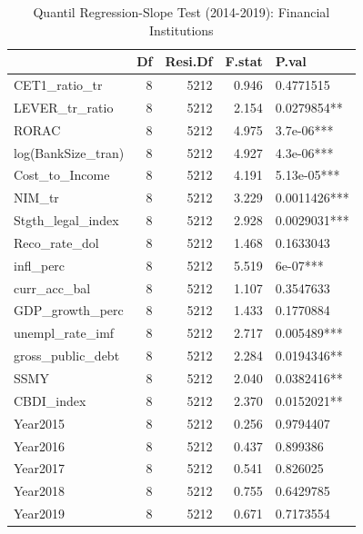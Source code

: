 \begin{table}[ht]
\centering
\caption{Quantil Regression-Slope Test (2014-2019): Financial Institutions} 
\begingroup\small
\begin{tabular}{lrrrl}
  \toprule
 & Df & Resi.Df & F.stat & P.val \\ 
  \midrule
CET1\_ratio\_tr & 8 & 5212 & 0.946 & 0.4771515 \\ 
  LEVER\_tr\_ratio & 8 & 5212 & 2.154 & 0.0279854** \\ 
  RORAC & 8 & 5212 & 4.975 & 3.7e-06*** \\ 
  log(BankSize\_tran) & 8 & 5212 & 4.927 & 4.3e-06*** \\ 
  Cost\_to\_Income & 8 & 5212 & 4.191 & 5.13e-05*** \\ 
  NIM\_tr & 8 & 5212 & 3.229 & 0.0011426*** \\ 
  Stgth\_legal\_index & 8 & 5212 & 2.928 & 0.0029031*** \\ 
  Reco\_rate\_dol & 8 & 5212 & 1.468 & 0.1633043 \\ 
  infl\_perc & 8 & 5212 & 5.519 & 6e-07*** \\ 
  curr\_acc\_bal & 8 & 5212 & 1.107 & 0.3547633 \\ 
  GDP\_growth\_perc & 8 & 5212 & 1.433 & 0.1770884 \\ 
  unempl\_rate\_imf & 8 & 5212 & 2.717 & 0.005489*** \\ 
  gross\_public\_debt & 8 & 5212 & 2.284 & 0.0194346** \\ 
  SSMY & 8 & 5212 & 2.040 & 0.0382416** \\ 
  CBDI\_index & 8 & 5212 & 2.370 & 0.0152021** \\ 
  Year2015 & 8 & 5212 & 0.256 & 0.9794407 \\ 
  Year2016 & 8 & 5212 & 0.437 & 0.899386 \\ 
  Year2017 & 8 & 5212 & 0.541 & 0.826025 \\ 
  Year2018 & 8 & 5212 & 0.755 & 0.6429785 \\ 
  Year2019 & 8 & 5212 & 0.671 & 0.7173554 \\ 
   \bottomrule
\end{tabular}
\endgroup
\end{table}
